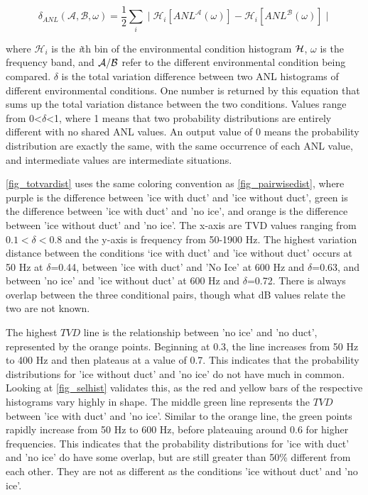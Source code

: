 
\begin{equation} \label{tdv_eq}
    \delta_{ANL} ( \mathcal{A}, \mathcal{B}, \omega) = \frac{1}{2} \sum _{i} ^{} \mid \mathcal{H}_{i} [ANL^{\mathcal{A}}(\omega)] -\mathcal{H}_{i} [ANL^{\mathcal{B}}(\omega)] \mid 
\end{equation}

where  $\mathcal{H}_{i}$ is the \textit{i}th bin of the environmental condition histogram $\cal{H}$, $\omega$ is the frequency band, and $\cal{A/B}$ refer to the different environmental condition being compared. $\delta$ is the total variation difference between two ANL histograms of different environmental conditions. One number is returned by this equation that sums up the total variation distance between the two conditions. Values range from 0<$\delta$<1, where 1 means that two probability distributions are entirely different with no shared ANL values. An output value of 0 means the probability distribution are exactly the same, with the same occurrence of each ANL value, and intermediate values are intermediate situations.

\autoref{fig_totvardist} uses the same coloring convention as \autoref{fig_pairwisedist}, where purple is the difference between 'ice with duct' and 'ice without duct', green is the difference between 'ice with duct' and 'no ice', and orange is the difference between 'ice without duct' and 'no ice'. The x-axis are TVD values ranging from $0.1<\delta<0.8$ and the y-axis is frequency from 50-1900 Hz. The highest variation distance between the conditions ‘ice with duct' and 'ice without duct’ occurs at 50 Hz at $\delta$=0.44, between 'ice with duct' and 'No Ice' at 600 Hz and $\delta$=0.63, and between 'no ice' and 'ice without duct' at 600 Hz and $\delta$=0.72. There is always overlap between the three conditional pairs, though what dB values relate the two are not known. 

The highest $TVD$ line is the relationship between 'no ice' and 'no duct', represented by the orange points. Beginning at 0.3, the line increases from 50 Hz to 400 Hz and then plateaus at a value of 0.7. This indicates that the probability distributions for 'ice without duct' and 'no ice' do not have much in common. Looking at \autoref{fig_selhist} validates this, as the red and yellow bars of the respective histograms vary highly in shape. The middle green line represents the $TVD$ between 'ice with duct' and 'no ice'. Similar to the orange line, the green points rapidly increase from 50 Hz to 600 Hz, before plateauing around 0.6 for higher frequencies. This indicates that the probability distributions for 'ice with duct' and 'no ice' do have some overlap, but are still greater than 50\% different from each other. They are not as different as the conditions 'ice without duct' and 'no ice'. 

